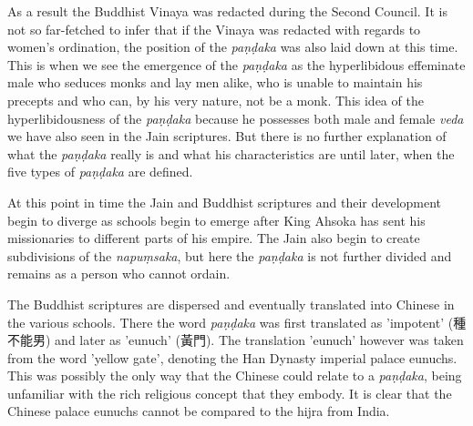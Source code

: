 As a result the Buddhist Vinaya was redacted during the Second Council. It is not so far-fetched to infer that if the Vinaya was redacted with regards to women's ordination, the position of the {\em paṇḍaka} was also laid down at this time. This is when we see the emergence of the {\em paṇḍaka} as the hyperlibidous effeminate male who seduces monks and lay men alike, who is unable to maintain his precepts and who can, by his very nature, not be a monk. This idea of the hyperlibidousness of the {\em paṇḍaka} because he possesses both male and female {\em veda} we have also seen in the Jain scriptures. But there is no further explanation of what the {\em paṇḍaka} really is and what his characteristics are until later, when the five types of {\em paṇḍaka} are defined. 

At this point in time the Jain and Buddhist scriptures and their development begin to diverge as schools begin to emerge after King Ahsoka has sent his missionaries to different parts of his empire. The Jain also begin to create subdivisions of the {\em napuṃsaka}, but here the {\em paṇḍaka} is not further divided and remains as a person who cannot ordain. 

The Buddhist scriptures are dispersed and eventually translated into Chinese in the various schools. There the word {\em paṇḍaka} was first translated as 'impotent' (種不能男) and later as 'eunuch' (黃門). The translation 'eunuch' however was taken from the word 'yellow gate', denoting the Han Dynasty imperial palace eunuchs. This was possibly the only way that the Chinese could relate to a {\em paṇḍaka}, being unfamiliar with the rich religious concept that they embody. It is clear that the Chinese palace eunuchs cannot be compared to the hijra from India.

